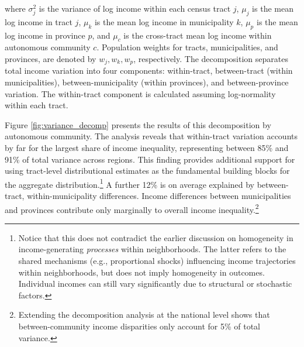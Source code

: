 where $\sigma^2_{j}$ is the variance of log income within each census tract $j$, $\mu_j$ is the mean log income in tract $j$, $\mu_k$ is the mean log income in municipality $k$, $\mu_p$ is the mean log income in province $p$, and  $\mu_{c}$ is the cross-tract mean log income within autonomous community $c$. Population weights for tracts, municipalities, and provinces, are denoted by $w_j, w_k, w_p$, respectively. The decomposition separates total income variation into four components: within-tract, between-tract (within municipalities), between-municipality (within provinces), and between-province variation. The within-tract component is calculated assuming log-normality within each tract.

Figure \ref{fig:variance_decomp} presents the results of this decomposition by autonomous community. The analysis reveals that within-tract variation accounts by far for the largest share of income inequality, representing between 85\% and 91\% of total variance across regions. This finding provides additional support for using tract-level distributional estimates as the fundamental building blocks for the aggregate distribution.\footnote{Notice that this does not contradict the earlier discussion on homogeneity in income-generating \textit{processes} within neighborhoods. The latter refers to the shared mechanisms (e.g., proportional shocks) influencing income trajectories within neighborhoods, but does not imply homogeneity in outcomes. Individual incomes can still vary significantly due to structural or stochastic factors.} A further 12\% is on average explained by between-tract, within-municipality differences. Income differences between municipalities and provinces contribute only marginally to overall income inequality.\footnote{Extending the decomposition analysis at the national level shows that between-community income disparities only account for 5\% of total variance.}

